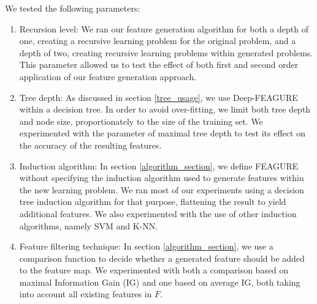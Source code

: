 \documentclass[twoside,11pt]{article}
\theoremstyle{definition}
\begin{document}
We tested the following parameters: 
\begin{enumerate}
	\item Recursion level: We ran our feature generation algorithm for both a depth of one, creating a recursive learning problem for the original problem, and a depth of two, creating recursive learning problems within generated problems. This parameter allowed us to test the effect of both first and second order application of our feature generation approach.
	\item Tree depth: As discussed in section \ref{tree_usage}, we use Deep-FEAGURE within a decision tree. In order to avoid over-fitting, we limit both tree depth and node size, proportionately to the size of the training set. We experimented with the parameter of maximal tree depth to test its effect on the accuracy of the resulting features.
	\item Induction algorithm: In section \ref{algorithm_section}, we define FEAGURE without specifying the induction algorithm used to generate features within the new learning problem. We ran most of our experiments using a decision tree induction algorithm for that purpose, flattening the result to yield additional features. We also experimented with the use of other induction algorithms, namely SVM and K-NN.
	\item Feature filtering technique: In section \ref{algorithm_section}, we use a comparison function to decide whether a generated feature should be added to the feature map. We experimented with both a comparison based on maximal Information Gain (IG) and one based on average IG, both taking into account all existing features in $F$.
\end{enumerate}


\end{document}
